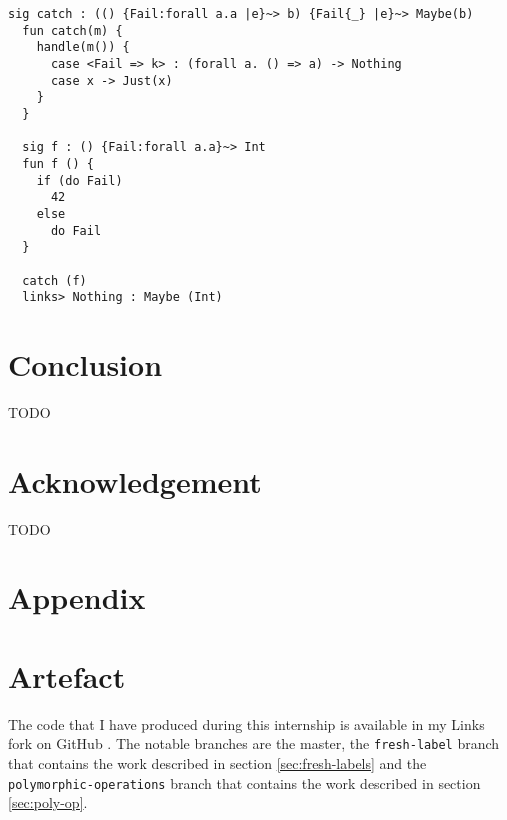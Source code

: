 \documentclass[11pt, nonacm=true, language=french, language=english]{acmart}
\begin{document}
\begin{lstlisting}[caption=Polymorphism example]
  sig catch : (() {Fail:forall a.a |e}~> b) {Fail{_} |e}~> Maybe(b)
  fun catch(m) {
    handle(m()) {
      case <Fail => k> : (forall a. () => a) -> Nothing
      case x -> Just(x)
    }
  }

  sig f : () {Fail:forall a.a}~> Int
  fun f () {
    if (do Fail)
      42
    else
      do Fail
  }

  catch (f)
  links> Nothing : Maybe (Int)
\end{lstlisting}



\section{Conclusion}
\label{sec:conclusion}

TODO

\section{Acknowledgement}
\label{sec:acknowledgement}

TODO





























\newpage

\appendix

\section*{Appendix}

\section{Artefact}
\label{sec:code-production}

The code that I have produced during this internship is available in my Links fork on GitHub \cite{gh:mylinks}. The notable branches are the master, the \texttt{fresh-label} branch that contains the work described in section \ref{sec:fresh-labels} and the \texttt{polymorphic-operations} branch that contains the work described in section \ref{sec:poly-op}.
\end{document}
